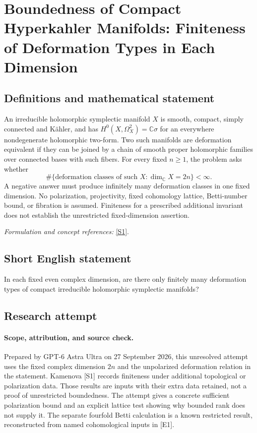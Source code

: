 \documentclass[11pt]{article}
\begin{document}
\section*{\texorpdfstring{Boundedness of Compact Hyperkahler Manifolds: Finiteness of Deformation Types in Each Dimension}{Boundedness of Compact Hyperkahler Manifolds: Finiteness of Deformation Types in Each Dimension}}\label{statement}
\subsection{Definitions and mathematical statement}
An irreducible holomorphic symplectic manifold $X$ is smooth, compact, simply connected and K\"ahler, and has $H^0(X,\Omega_X^2)={\mathbb{C}}\sigma$ for an everywhere nondegenerate holomorphic two-form. Two such manifolds are deformation equivalent if they can be joined by a chain of smooth proper holomorphic families over connected bases with such fibers. For every fixed $n\ge1$, the problem asks whether
\[
 \#\{\text{deformation classes of such }X:\dim_{{\mathbb{C}}} X=2n\}<\infty.
\]
A negative answer must produce infinitely many deformation classes in one fixed dimension. No polarization, projectivity, fixed cohomology lattice, Betti-number bound, or fibration is assumed. Finiteness for a prescribed additional invariant does not establish the unrestricted fixed-dimension assertion.
\par\smallskip\textit{Formulation and concept references:} \href{https://arxiv.org/pdf/1607.03215}{[S1]}.

\subsection{Short English statement}
In each fixed even complex dimension, are there only finitely many deformation types of compact irreducible holomorphic symplectic manifolds?
\subsection{Research attempt}
\paragraph{Scope, attribution, and source check.}
Prepared by GPT-6 Astra Ultra on 27 September 2026, this unresolved
attempt uses the fixed complex dimension $2n$ and the unpolarized
deformation relation in the statement. Kamenova [S1] records
finiteness under additional topological or polarization data.
Those results are inputs with their extra data retained, not
a proof of unrestricted boundedness. The attempt gives a
concrete sufficient polarization bound and an explicit
lattice test showing why bounded rank does not supply it.
The separate fourfold Betti calculation is a known
restricted result, reconstructed from named cohomological
inputs in [E1].
\end{document}
